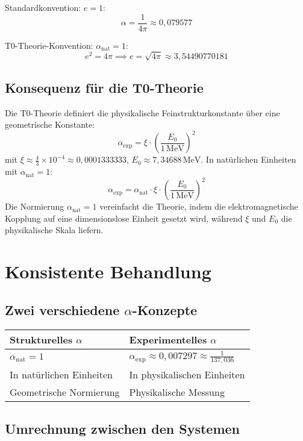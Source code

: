 \documentclass[12pt,a4paper]{article}
\theoremstyle{definition}
\begin{document}
Standardkonvention: \(e = 1\):
\[
\alpha = \frac{1}{4\pi} \approx 0{,}079577
\]

T0-Theorie-Konvention: \(\alpha_{\text{nat}} = 1\):
\[
e^2 = 4\pi \implies e = \sqrt{4\pi} \approx 3{,}54490770181
\]

\subsection*{Konsequenz für die T0-Theorie}

Die T0-Theorie definiert die physikalische Feinstrukturkonstante über eine geometrische Konstante:
\[
\alpha_{\text{exp}} = \xi \cdot \left(\frac{E_0}{1 \, \text{MeV}}\right)^2
\]
mit \(\xi \approx \frac{4}{3} \times 10^{-4} \approx 0{,}0001333333\), \(E_0 \approx 7{,}34688 \, \text{MeV}\). In natürlichen Einheiten mit \(\alpha_{\text{nat}} = 1\):
\[
\alpha_{\text{exp}} = \alpha_{\text{nat}} \cdot \xi \cdot \left(\frac{E_0}{1 \, \text{MeV}}\right)^2
\]
Die Normierung \(\alpha_{\text{nat}} = 1\) vereinfacht die Theorie, indem die elektromagnetische Kopplung auf eine dimensionslose Einheit gesetzt wird, während \(\xi\) und \(E_0\) die physikalische Skala liefern.

\section*{Konsistente Behandlung}

\subsection*{Zwei verschiedene \(\alpha\)-Konzepte}

\begin{tcolorbox}[colback=blue!5!white,colframe=blue!75!black]
	\begin{tabular}{p{}p{}}
		Strukturelles \(\alpha\) & Experimentelles \(\alpha\) \\
		\hline
		\(\alpha_{\text{nat}} = 1\) & \(\alpha_{\text{exp}} \approx 0{,}007297 \approx \frac{1}{137{,}036}\) \\
		In natürlichen Einheiten & In physikalischen Einheiten \\
		Geometrische Normierung & Physikalische Messung \\
	\end{tabular}
\end{tcolorbox}

\subsection*{Umrechnung zwischen den Systemen}
\end{document}
